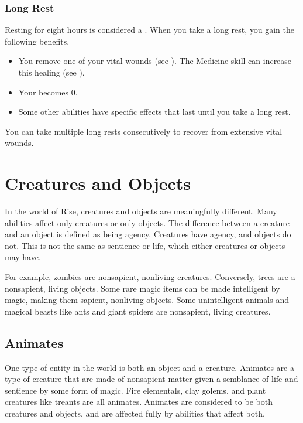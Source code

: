         \subsubsection{Long Rest}\label{Long Rest}
            Resting for eight hours is considered a .
            When you take a long rest, you gain the following benefits.
            \begin{itemize}
                \item You remove one of your vital wounds (see ).
                    The Medicine skill can increase this healing (see ).
                \item Your  becomes 0.
                \item Some other abilities have specific effects that last until you take a long rest.
            \end{itemize}

            You can take multiple long rests consecutively to recover from extensive vital wounds.

\section{Creatures and Objects}
    In the world of Rise, creatures and objects are meaningfully different.
    Many abilities affect only creatures or only objects.
    The difference between a creature and an object is defined as being agency.
    Creatures have agency, and objects do not.
    This is not the same as sentience or life, which either creatures or objects may have.

    For example, zombies are nonsapient, nonliving creatures.
    Conversely, trees are a nonsapient, living objects.
    Some rare magic items can be made intelligent by magic, making them sapient, nonliving objects.
    Some unintelligent animals and magical beasts like ants and giant spiders are nonsapient, living creatures.

    \subsection{Animates}
        One type of entity in the world is both an object and a creature.
        Animates are a type of creature that are made of nonsapient matter given a semblance of life and sentience by some form of magic.
        Fire elementals, clay golems, and plant creatures like treants are all animates.
        Animates are considered to be both creatures and objects, and are affected fully by abilities that affect both.

